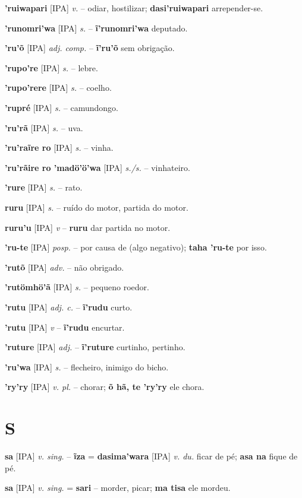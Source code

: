 \textbf{'ruiwapari} [IPA] \textit{v.} -- odiar, hostilizar; \textbf{dasi'ruiwapari} arrepender-se.

\textbf{'runomri'wa} [IPA] \textit{s.} -- \textbf{ĩ'runomri'wa} deputado.

\textbf{'ru'õ} [IPA] \textit{adj. comp.} -- \textbf{ĩ'ru'õ} sem obrigação.

\textbf{'rupo're} [IPA] \textit{s.} -- lebre.

\textbf{'rupo'rere} [IPA] \textit{s.} -- coelho.

\textbf{'rupré} [IPA] \textit{s.} -- camundongo.

\textbf{'ru'rã} [IPA] \textit{s.} -- uva.

\textbf{'ru'raĩre ro} [IPA] \textit{s.} -- vinha.

\textbf{'ru'rãire ro 'madö'ö'wa} [IPA] \textit{s./s.} -- vinhateiro.

\textbf{'rure} [IPA] \textit{s.} -- rato.

\textbf{ruru} [IPA] \textit{s.} -- ruído do motor, partida do motor.

\textbf{ruru'u} [IPA] \textit{v} -- \textbf{ruru} dar partida no motor.

\textbf{'ru-te} [IPA] \textit{posp.} -- por causa de (algo negativo); \textbf{taha 'ru-te} por isso.

\textbf{'rutõ} [IPA] \textit{adv.} -- não obrigado.

\textbf{'rutömhö'ã} [IPA] \textit{s.} -- pequeno roedor.

\textbf{'rutu} [IPA] \textit{adj. c.} -- \textbf{ĩ'rudu} curto.

\textbf{'rutu} [IPA] \textit{v} -- \textbf{ĩ'rudu} encurtar.

\textbf{'ruture} [IPA] \textit{adj.} -- \textbf{ĩ'ruture} curtinho, pertinho.

\textbf{'ru'wa} [IPA] \textit{s.} -- flecheiro, inimigo do bicho.

\textbf{'ry'ry} [IPA] \textit{v. pl.} -- chorar; \textbf{õ hã, te 'ry'ry} ele chora.


\section*{S}

\textbf{sa} [IPA] \textit{v. sing.} -- \textbf{ĩza} = \textbf{dasima'wara} [IPA] \textit{v. du.} ficar de pé; \textbf{asa na} fique de pé.

\textbf{sa} [IPA] \textit{v. sing.} = \textbf{sari} -- morder, picar; \textbf{ma tisa} ele mordeu.

